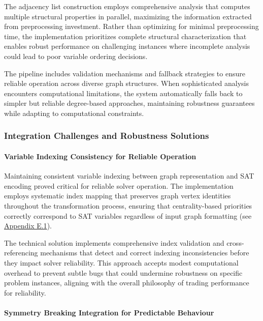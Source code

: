 The adjacency list construction employs comprehensive analysis that computes multiple structural properties in parallel, maximizing the information extracted from preprocessing investment. Rather than optimizing for minimal preprocessing time, the implementation prioritizes complete structural characterization that enables robust performance on challenging instances where incomplete analysis could lead to poor variable ordering decisions.

The pipeline includes validation mechanisms and fallback strategies to ensure reliable operation across diverse graph structures. When sophisticated analysis encounters computational limitations, the system automatically falls back to simpler but reliable degree-based approaches, maintaining robustness guarantees while adapting to computational constraints.

\subsubsection{Integration Challenges and Robustness Solutions}

\paragraph{Variable Indexing Consistency for Reliable Operation}

Maintaining consistent variable indexing between graph representation and SAT encoding proved critical for reliable solver operation. The implementation employs systematic index mapping that preserves graph vertex identities throughout the transformation process, ensuring that centrality-based priorities correctly correspond to SAT variables regardless of input graph formatting (see \hyperref[appendix:variable-indexing]{Appendix E.1}).

The technical solution implements comprehensive index validation and cross-ref\-er\-enc\-ing mechanisms that detect and correct indexing inconsistencies before they impact solver reliability. This approach accepts modest computational overhead to prevent subtle bugs that could undermine robustness on specific problem instances, aligning with the overall philosophy of trading performance for reliability.

\paragraph{Symmetry Breaking Integration for Predictable Behaviour}

